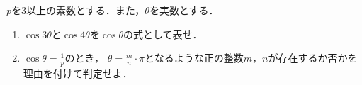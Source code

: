 \documentclass[../../main.tex]{subfiles}
\begin{document}
$p$を3以上の素数とする．また，$\theta$を実数とする．
\begin{enumerate}
  \item$\cos3\theta$と$\cos4\theta$を$\cos\theta$の式として表せ．
  \item$\displaystyle\cos\theta=\frac{1}{p}$のとき，
    $\displaystyle\theta=\frac{m}{n}\cdot\pi$となるような正の整数$m$，$n$が存在するか否かを
    理由を付けて判定せよ．
\end{enumerate}
\end{document}

